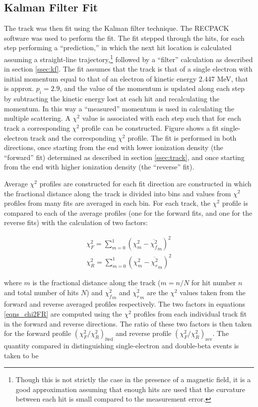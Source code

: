 \documentclass{JINST}
\begin{document}
\subsection{Kalman Filter Fit}
The track was then fit using the Kalman filter technique.  The RECPACK \cite{Recpack} software was used to perform the fit.  The fit stepped through the hits, for each step performing a ``prediction,'' in which the next hit location is calculated assuming a straight-line trajectory,\footnote{Though this is not strictly the case in the presence of a magnetic field, it is a good approximation assuming that enough hits are used that the curvature between each hit is small compared to the measurement error.} followed by a ``filter'' calculation as described in section \ref{ssec:kf}.  The fit assumes that the track is that of a single electron with initial momentum equal to that of an electron of kinetic energy 2.447 MeV, that is approx. $p_{i} = 2.9$, and the value of the momentum is updated along each step by subtracting the kinetic energy lost at each hit and recalculating the momentum.  In this way a ``measured'' momentum is used in calculating the multiple scattering.  A $\chi^2$ value is associated with each step such that for each track a corresponding $\chi^2$ profile can be constructed.  Figure shows a fit single-electron track and the corresponding $\chi^2$ profile.  The fit is performed in both directions, once starting from the end with lower ionization density (the ``forward'' fit) determined as described in section \ref{ssec:track}, and once starting from the end with higher ionization density (the ``reverse'' fit).



Average $\chi^2$ profiles are constructed for each fit direction are constructed in which the fractional distance along the track is divided into bins and values from $\chi^2$ profiles from many fits are averaged in each bin.  For each track, the $\chi^2$ profile is compared to each of the average profiles (one for the forward fits, and one for the reverse fits) with the calculation of two factors:

\begin{eqnarray}\label{eqns_chi2FR}
\chi^2_F = \sum_{m=0}^{1}(\chi^2_m - \overline{\chi_{f}^2}_{m})^2\\
\chi^2_R = \sum_{m=0}^{1}(\chi^2_m - \overline{\chi_{r}^2}_{m})^2
\end{eqnarray}

\noindent where $m$ is the fractional distance along the track ($m = n/N$ for hit number $n$ and total number of hits $N$) and $\overline{\chi_{f}^2}_{m}$ and $\overline{\chi_{r}^2}_{m}$ are the $\chi^2$ values taken from the forward and reverse averaged profiles respectively.  The two factors in equations \ref{eqns_chi2FR} are computed using the $\chi^2$ profiles from each individual track fit in the forward and reverse directions.  The ratio of these two factors is then taken for the forward profile $(\chi^2_F/\chi^2_R)_{\mathrm{fwd}}$ and reverse profile $(\chi^2_F/\chi^2_R)_{\mathrm{rev}}$.  The quantity compared in distinguishing single-electron and double-beta events is taken to be 
\end{document}
